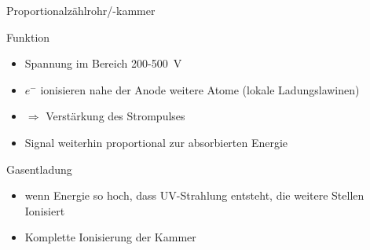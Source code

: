 % 	
	

\begin{frame}{Proportionalzählrohr/-kammer}
	\begin{block}{Funktion}
		\begin{itemize}
		  \item Spannung im Bereich 200-500~V
		  	\item $e^-$ ionisieren nahe der Anode weitere Atome (lokale Ladungslawinen)
			\item $\Rightarrow$ Verstärkung des Strompulses
		  	\item Signal weiterhin proportional zur absorbierten Energie
		\end{itemize}
	\end{block}
	
	\begin{block}{Gasentladung}
		\begin{itemize}
	  		\item wenn Energie so hoch, dass UV-Strahlung entsteht, die weitere Stellen
	  		Ionisiert
	  		\item Komplette Ionisierung der Kammer 
		\end{itemize}
	\end{block}
\end{frame}
